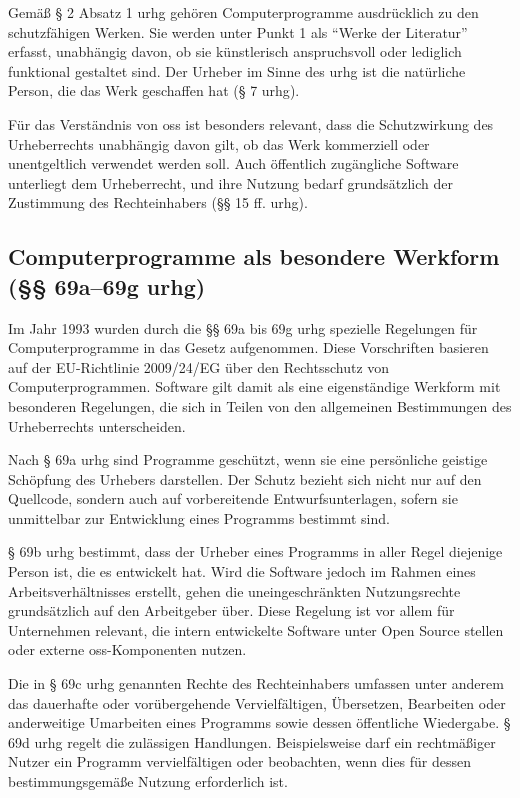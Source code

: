 Gemäß § 2 Absatz 1 \gls{urhg} gehören Computerprogramme ausdrücklich zu den schutzfähigen Werken.
Sie werden unter Punkt 1 als \enquote{Werke der Literatur} erfasst, unabhängig davon, ob sie künstlerisch anspruchsvoll oder lediglich funktional gestaltet sind.
Der Urheber im Sinne des \gls{urhg} ist die natürliche Person, die das Werk geschaffen hat (§ 7 \gls{urhg}).

Für das Verständnis von \gls{oss} ist besonders relevant, dass die Schutzwirkung des Urheberrechts unabhängig davon gilt, ob das Werk kommerziell oder unentgeltlich verwendet werden soll.
Auch öffentlich zugängliche Software unterliegt dem Urheberrecht, und ihre Nutzung bedarf grundsätzlich der Zustimmung des Rechteinhabers (§§ 15 ff. \gls{urhg}).


\subsection{Computerprogramme als besondere Werkform (§§ 69a–69g \gls{urhg})}

Im Jahr 1993 wurden durch die §§ 69a bis 69g \gls{urhg} spezielle Regelungen für Computerprogramme in das Gesetz aufgenommen.
Diese Vorschriften basieren auf der EU-Richtlinie 2009/24/EG über den Rechtsschutz von Computerprogrammen.
Software gilt damit als eine eigenständige Werkform mit besonderen Regelungen, die sich in Teilen von den allgemeinen Bestimmungen des Urheberrechts unterscheiden.

Nach § 69a \gls{urhg} sind Programme geschützt, wenn sie eine persönliche geistige Schöpfung des Urhebers darstellen.
Der Schutz bezieht sich nicht nur auf den Quellcode, sondern auch auf vorbereitende Entwurfsunterlagen, sofern sie unmittelbar zur Entwicklung eines Programms bestimmt sind.

§ 69b \gls{urhg} bestimmt, dass der Urheber eines Programms in aller Regel diejenige Person ist, die es entwickelt hat.
Wird die Software jedoch im Rahmen eines Arbeitsverhältnisses erstellt, gehen die uneingeschränkten Nutzungsrechte grundsätzlich auf den Arbeitgeber über.
Diese Regelung ist vor allem für Unternehmen relevant, die intern entwickelte Software unter Open Source stellen oder externe \gls{oss}-Komponenten nutzen.

Die in § 69c \gls{urhg} genannten Rechte des Rechteinhabers umfassen unter anderem das dauerhafte oder vorübergehende Vervielfältigen, Übersetzen, Bearbeiten oder anderweitige Umarbeiten eines Programms sowie dessen öffentliche Wiedergabe.
§ 69d \gls{urhg} regelt die zulässigen Handlungen.
Beispielsweise darf ein rechtmäßiger Nutzer ein Programm vervielfältigen oder beobachten, wenn dies für dessen bestimmungsgemäße Nutzung erforderlich ist.

